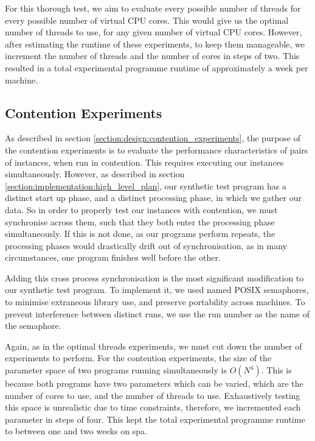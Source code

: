 For this thorough test, we aim to evaluate every possible number of threads for every possible number of virtual CPU cores. This would give us the optimal number of threads to use, for any given number of virtual CPU cores. However, after estimating the runtime of these experiments, to keep them manageable, we increment the number of threads and the number of cores in steps of two. This resulted in a total experimental programme runtime of approximately a week per machine.



\subsection{Contention Experiments}
\label{section:experimental_methodology:contention_experiments}

As described in section \ref{section:design:contention_experiments}, the purpose of the contention experiments is to evaluate the performance characteristics of pairs of instances, when run in contention. This requires executing our instances simultaneously. However, as described in section \ref{section:implementation:high_level_plan}, our synthetic test program has a distinct start up phase, and a distinct processing phase, in which we gather our data. So in order to properly test our instances with contention, we must synchronise across them, such that they both enter the processing phase simultaneously. If this is not done, as our programs perform repeats, the processing phases would drastically drift out of synchronisation, as in many circumstances, one program finishes well before the other.

Adding this cross process synchronisation is the most significant modification to our synthetic test program. To implement it, we used named POSIX semaphores, to minimise extraneous library use, and preserve portability across machines. To prevent interference between distinct runs, we use the run number as the name of the semaphore.

Again, as in the optimal threads experiments, we must cut down the number of experiments to perform. For the contention experiments, the size of the parameter space of two programs running simultaneously is $O(N^4)$. This is because both programs have two parameters which can be varied, which are the number of cores to use, and the number of threads to use. Exhaustively testing this space is unrealistic due to time constraints, therefore, we incremented each parameter in steps of four. This kept the total experimental programme runtime to between one and two weeks on spa.

